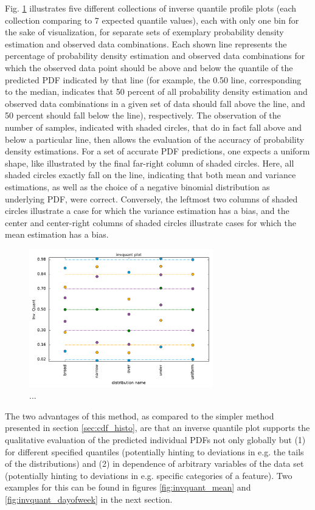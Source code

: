 \documentclass[BCOR=1mm, DIV=calc,10pt,
twoside=true,
twocolumn,
headings=normal]{scrartcl}
\newcommand{\fig}{Fig. }
\begin{document}
\fig \ref{fig:invquant_profiles} illustrates five different collections of inverse quantile profile plots (each collection comparing to 7 expected quantile values), each with only one bin for the sake of visualization, for separate sets of exemplary probability density estimation and observed data combinations. Each shown line represents the percentage of probability density estimation and observed data combinations for which the observed data point should be above and below the quantile of the predicted PDF indicated by that line (for example, the 0.50 line, corresponding to the median, indicates that 50 percent of all probability density estimation and observed data combinations in a given set of data should fall above the line, and 50 percent should fall below the line), respectively. The observation of the number of samples, indicated with shaded circles, that do in fact fall above and below a particular line, then allows the evaluation of the accuracy of probability density estimations. For a set of accurate PDF predictions, one expects a uniform shape, like illustrated by the final far-right column of shaded circles. Here, all shaded circles exactly fall on the line, indicating that both mean and variance estimations, as well as the choice of a negative binomial distribution as underlying PDF, were correct. Conversely, the leftmost two columns of shaded circles illustrate a case for which the variance estimation has a bias, and the center and center-right columns of shaded circles illustrate cases for which the mean estimation has a bias.

\begin{figure}
\begin{center}
\includegraphics[width=8cm]{../figures/invquant_profiles}
\caption{\label{fig:invquant_profiles} ...}
\end{center}
\end{figure}

The two advantages of this method, as compared to the simpler method presented in section \ref{sec:cdf_histo}, are that an inverse quantile plot supports the qualitative evaluation of the predicted individual PDFs not only globally but (1) for different specified quantiles (potentially hinting to deviations in e.g. the tails of the distributions) and (2) in dependence of arbitrary variables of the data set (potentially hinting to deviations in e.g. specific categories of a feature). Two examples for this can be found in figures \ref{fig:invquant_mean} and \ref{fig:invquant_dayofweek} in the next section.
\end{document}
